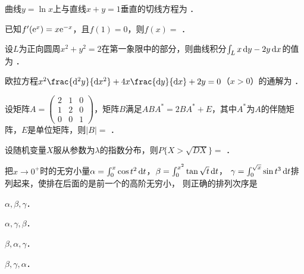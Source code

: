\documentclass[plain,noanswer,medmath]{../../template/jnuexam}
\begin{document}




\begin{problem}
曲线$y = \ln x$上与直线$x + y = 1$垂直的切线方程为 \fillin{}．
\end{problem}


\begin{problem}
已知$f'(\mathrm{e}^x) = x\mathrm{e}^{- x}$，且$f(1) = 0$，则$f(x) =$ \fillin{}．
\end{problem}


\begin{problem}
设$L$为正向圆周$x^2 + y^2 = 2$在第一象限中的部分，则曲线积分$\int_L x\mathop{}\!\mathrm{d} y - 2y\mathop{}\!\mathrm{d} x$的值为 \fillin{}．
\end{problem}


\begin{problem}
欧拉方程$x^2\frac{\d^2y}{\dx^2} + 4x\frac{\dy}{\dx} + 2y = 0$（$x > 0$）的通解为 \fillin{}．
\end{problem}


\begin{problem}
设矩阵$A = \begin{pmatrix}
  2 & 1 & 0 \\
  1 & 2 & 0 \\
  0 & 0 & 1
\end{pmatrix}$，矩阵$B$满足$AB A^* = 2BA^* + E$，其中$A^*$为$A$的伴随矩阵，$E$是单位矩阵，则$|B| =$ \fillin{}．
\end{problem}


\begin{problem}
设随机变量$X$服从参数为$\lambda$的指数分布，则$P\{X > \sqrt{DX}\} =$ \fillin{}．
\end{problem}




\begin{problem}
把$x \to 0^+$时的无穷小量$\alpha = \int_0^x \cos t^2 \mathop{}\!\mathrm{d} t$，$\beta = \int_0^{x^2} \tan \sqrt{t} \mathop{}\!\mathrm{d} t$，
$\gamma = \int_0^{\sqrt{x}} \sin t^3 \mathop{}\!\mathrm{d} t$排列起来，使排在后面的是前一个的高阶无穷小，
则正确的排列次序是\pickout{}
\begin{abcd}
\item $\alpha ,\beta ,\gamma$．
\item $\alpha ,\gamma ,\beta$．
\item $\beta ,\alpha ,\gamma$．
\item $\beta ,\gamma ,\alpha$．
\end{abcd}
\end{problem}
\end{document}
